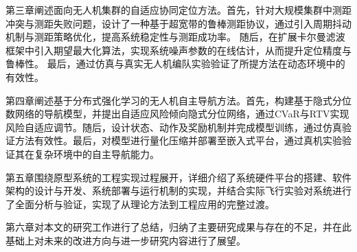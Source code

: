 第三章阐述面向无人机集群的自适应协同定位方法。首先，针对大规模集群中测距冲突与测距失败问题，设计了一种基于超宽带的鲁棒测距协议，通过引入周期抖动机制与测距策略优化，提高系统稳定性与测距成功率。
随后，在扩展卡尔曼滤波框架中引入期望最大化算法，实现系统噪声参数的在线估计，从而提升定位精度与鲁棒性。
最后，通过仿真与真实无人机编队实验验证了所提方法在动态环境中的有效性。

第四章阐述基于分布式强化学习的无人机自主导航方法。首先，构建基于隐式分位数网络的导航模型，并提出自适应风险倾向隐式分位网络，通过CVaR与RTV实现风险自适应调节。随后，设计状态、动作及奖励机制并完成模型训练，通过仿真验证方法有效性。最后，对模型进行量化压缩并部署至嵌入式平台，通过真机实验验证其在复杂环境中的自主导航能力。

第五章围绕原型系统的工程实现过程展开，详细介绍了系统硬件平台的搭建、软件架构的设计与开发、系统部署与运行机制的实现，并结合实际飞行实验对系统进行了全面分析与验证，实现了从理论方法到工程应用的完整过渡。

第六章对本文的研究工作进行了总结，归纳了主要研究成果与存在的不足，并在此基础上对未来的改进方向与进一步研究内容进行了展望。